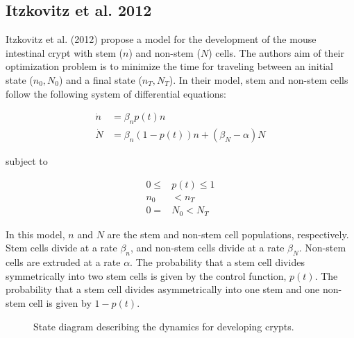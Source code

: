 \subsection*{Itzkovitz et al. 2012}

\noindent Itzkovitz et al. (2012) propose a model for the development of the mouse intestinal crypt with stem ($n$) and non-stem ($N$) cells. The authors aim of their optimization problem is to minimize the time for traveling between an initial state ($n_0, N_0$) and a final state ($n_T, N_T$). In their model, stem and non-stem cells follow the following system of differential equations:

\begin{align}
\dot{n} & = \beta_n p(t) n \nonumber \\
\dot{N} & = \beta_n (1-p(t)) n + (\beta_N - \alpha) N
\end{align}

\noindent subject to

\begin{align}
0 \leq & p(t) \leq 1 \nonumber \\
n_0 & < n_T \nonumber \\
0 = & N_0  < N_T 
\end{align}

\noindent In this model, $n$ and $N$ are the stem and non-stem cell populations, respectively. Stem cells divide at a rate $\beta_n$, and non-stem cells divide at a rate $\beta_N$. Non-stem cells are extruded at a rate $\alpha$. The probability that a stem cell divides symmetrically into two stem cells is given by the control function, $p(t)$. The probability that a stem cell divides asymmetrically into one stem and one non-stem cell is given by $1-p(t)$. 

\begin{figure}[!h]
\centering
{}
  \caption{State diagram describing the dynamics for developing crypts.}
  \label{fig:birds}
\end{figure}

